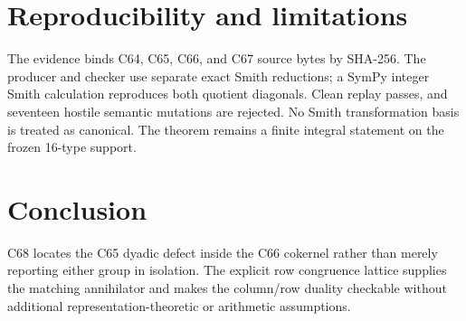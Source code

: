 \documentclass[10pt]{article}
\begin{document}
\section{Reproducibility and limitations}
The evidence binds C64, C65, C66, and C67 source bytes by SHA-256.  The
producer and checker use separate exact Smith reductions; a SymPy integer
Smith calculation reproduces both quotient diagonals.  Clean replay passes,
and seventeen hostile semantic mutations are rejected.  No Smith
transformation basis is treated as canonical.  The theorem remains a finite
integral statement on the frozen 16-type support.

\section{Conclusion}
C68 locates the C65 dyadic defect inside the C66 cokernel rather than merely
reporting either group in isolation.  The explicit row congruence lattice
supplies the matching annihilator and makes the column/row duality checkable
without additional representation-theoretic or arithmetic assumptions.
\end{document}
